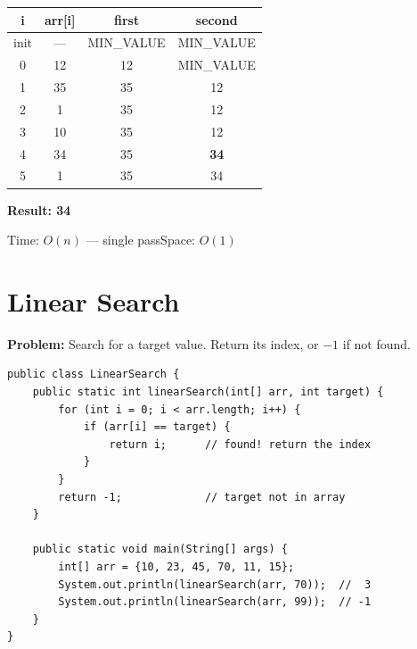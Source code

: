 \documentclass[12pt,a4paper,oneside]{book}
\begin{document}
\begin{dryrun}[Dry Run: arr = \{12, 35, 1, 10, 34, 1\}]
\begin{center}
\begin{tabular}{cccc}
\toprule
\textbf{i} & \textbf{arr[i]} & \textbf{first} & \textbf{second}\\
\midrule
init & ---& MIN\_VALUE & MIN\_VALUE\\
0    & 12 & 12         & MIN\_VALUE\\
1    & 35 & 35         & 12\\
2    & 1  & 35         & 12\\
3    & 10 & 35         & 12\\
4    & 34 & 35         & \textbf{34}\\
5    & 1  & 35         & 34\\
\bottomrule
\end{tabular}
\end{center}
\textbf{Result: 34}
\end{dryrun}

\begin{complexity}
Time: $O(n)$ --- single pass\quad Space: $O(1)$
\end{complexity}

\section{Linear Search}

\textbf{Problem:} Search for a target value. Return its index, or $-1$ if not found.

\begin{lstlisting}[caption={Linear Search --- scan left to right}]
public class LinearSearch {
    public static int linearSearch(int[] arr, int target) {
        for (int i = 0; i < arr.length; i++) {
            if (arr[i] == target) {
                return i;      // found! return the index
            }
        }
        return -1;             // target not in array
    }

    public static void main(String[] args) {
        int[] arr = {10, 23, 45, 70, 11, 15};
        System.out.println(linearSearch(arr, 70));  //  3
        System.out.println(linearSearch(arr, 99));  // -1
    }
}
\end{lstlisting}

\begin{center}
\end{center}
\end{document}

